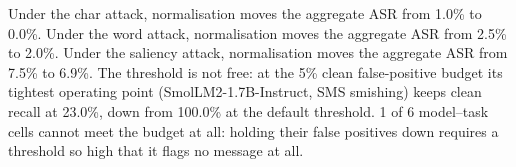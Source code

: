 Under the char attack, normalisation moves the aggregate ASR from 1.0\% to 0.0\%.
Under the word attack, normalisation moves the aggregate ASR from 2.5\% to 2.0\%.
Under the saliency attack, normalisation moves the aggregate ASR from 7.5\% to 6.9\%.
The threshold is not free: at the 5\% clean false-positive budget its tightest operating point (SmolLM2-1.7B-Instruct, SMS smishing) keeps clean recall at 23.0\%, down from 100.0\% at the default threshold.
1 of 6 model--task cells cannot meet the budget at all: holding their false positives down requires a threshold so high that it flags no message at all.
